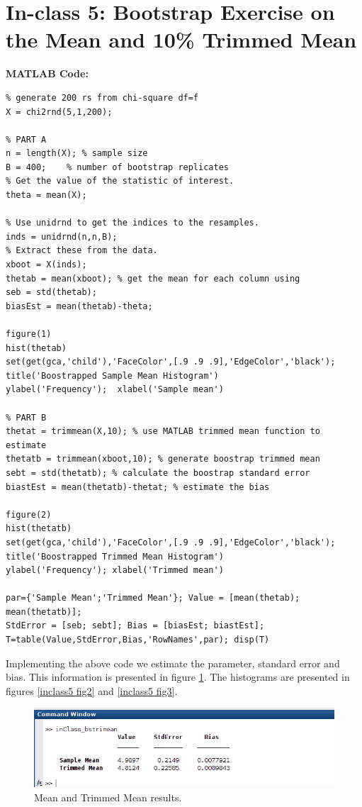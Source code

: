 \documentclass[12pt,a4paper]{article}
\begin{document}
\section*{In-class 5: Bootstrap Exercise on the Mean and 10\% Trimmed Mean}

\textbf{MATLAB Code:}

\begin{verbatim}
% generate 200 rs from chi-square df=f
X = chi2rnd(5,1,200);

% PART A
n = length(X); % sample size
B = 400;	% number of bootstrap replicates
% Get the value of the statistic of interest.
theta = mean(X);

% Use unidrnd to get the indices to the resamples.
inds = unidrnd(n,n,B);
% Extract these from the data.
xboot = X(inds);
thetab = mean(xboot); % get the mean for each column using
seb = std(thetab);
biasEst = mean(thetab)-theta;

figure(1)
hist(thetab)
set(get(gca,'child'),'FaceColor',[.9 .9 .9],'EdgeColor','black');
title('Boostrapped Sample Mean Histogram')
ylabel('Frequency');  xlabel('Sample mean')

% PART B
thetat = trimmean(X,10); % use MATLAB trimmed mean function to estimate 
thetatb = trimmean(xboot,10); % generate boostrap trimmed mean
sebt = std(thetatb); % calculate the boostrap standard error
biastEst = mean(thetatb)-thetat; % estimate the bias

figure(2)
hist(thetatb)
set(get(gca,'child'),'FaceColor',[.9 .9 .9],'EdgeColor','black');
title('Boostrapped Trimmed Mean Histogram')
ylabel('Frequency'); xlabel('Trimmed mean')

par={'Sample Mean';'Trimmed Mean'}; Value = [mean(thetab); mean(thetatb)];
StdError = [seb; sebt]; Bias = [biasEst; biastEst];
T=table(Value,StdError,Bias,'RowNames',par); disp(T)

\end{verbatim}

Implementing the above code we estimate the parameter, standard error and bias. This information is presented in figure \ref{inclass5 fig1}. The histograms are presented in figures \ref{inclass5 fig2} and \ref{inclass5 fig3}.

\begin{figure}[ht!]
\begin{center}
\includegraphics[scale=.6]{inClass5_code2.png}
\caption{Mean and Trimmed Mean results.}
\label{inclass5 fig1}
\end{center}
\end{figure}
\FloatBarrier
\end{document}
